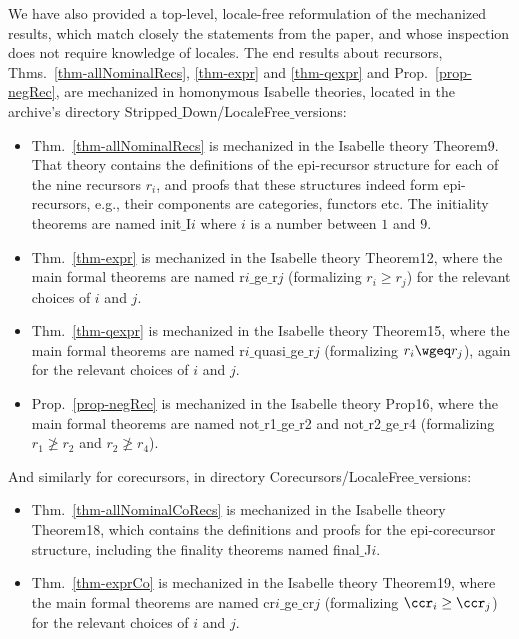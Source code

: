 We have also provided a top-level, locale-free reformulation of the 
mechanized results, which 
match closely the statements from the paper, and whose inspection  does not require %
knowledge of locales. 
%
The end results about recursors, %
Thms.~\ref{thm-allNominalRecs}, \ref{thm-expr} and \ref{thm-qexpr} 
and Prop.~\ref{prop-negRec}, are mechanized in homonymous Isabelle theories,  
located in the archive's directory 
\textsf{Stripped$\_$Down/LocaleFree$\_$versions}: 
\begin{itemize} 
	\item 
Thm.~\ref{thm-allNominalRecs} is mechanized in the Isabelle theory 
\textsf{Theorem9}. 
%
That theory contains the definitions of the epi-recursor structure for each 
of the nine recursors $r_i$, and proofs that these structures indeed form epi-recursors, 
e.g., their components are categories, functors etc. The initiality theorems are named \textsf{init$\_$I$i$} where 
$i$ is a number between $1$ and $9$. 
%
\item Thm.~\ref{thm-expr} is mechanized in the Isabelle theory 
\textsf{Theorem12}, where the main formal theorems are named r$i\_$ge$\_$r$j$ (formalizing $r_i \geq r_j$) for the relevant choices of 
$i$ and $j$. 
%
\item Thm.~\ref{thm-qexpr}  is mechanized in the Isabelle theory 
\textsf{Theorem15}, where the main formal theorems are named r$i\_$quasi$\_$ge$\_$r$j$ (formalizing $r_i \wgeq r_j$), again for the relevant choices of 
$i$ and $j$. 
%
\item Prop.~\ref{prop-negRec}  is mechanized in the Isabelle theory 
\textsf{Prop16}, where the main formal theorems are named \textsf{not$\_$r1$\_$ge$\_$r2}  and \textsf{not$\_$r2$\_$ge$\_$r4} 
(formalizing $r_1 \not\geq r_2$ and $r_2 \not\geq r_4$). 
\end{itemize} 


And similarly for corecursors, %
in directory 
\textsf{Corecursors/LocaleFree$\_$versions}: 
\begin{itemize} 
	\item 
	Thm.~\ref{thm-allNominalCoRecs} is mechanized in the Isabelle theory 
	\textsf{Theorem18}, 
which contains the definitions and proofs for the epi-corecursor structure, 
	including the finality theorems named \textsf{final$\_$J$i$}. 
	\item Thm.~\ref{thm-exprCo} is mechanized in the Isabelle theory 
	\textsf{Theorem19}, where the main formal theorems are named cr$i\_$ge$\_$cr$j$ (formalizing $\ccr_i \geq \ccr_j$) for the relevant choices of 
	$i$ and $j$. 
\end{itemize} 

